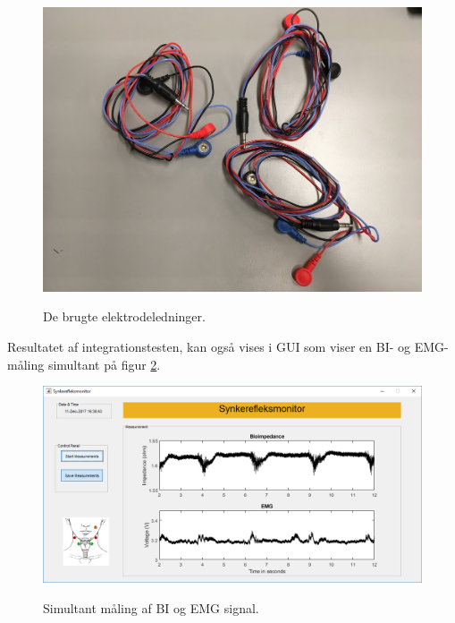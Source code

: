 \begin{figure}[H]
\centering
{\includegraphics[width=\linewidth]
{Figure/integrationstestBilleder4}}
\caption{De brugte elektrodeledninger. }
\label{fig:integrationstestBilleder4}
\end{figure} 



Resultatet af integrationstesten, kan også vises i GUI som viser en BI- og EMG-måling simultant på figur \ref{fig:integrationstestSynk1}. 


\begin{figure}[H]
\centering
{\includegraphics[width=\linewidth]
{Figure/integrationstestSynk1}}
\caption{Simultant måling af BI og EMG signal.}
\label{fig:integrationstestSynk1}
\end{figure} 




























